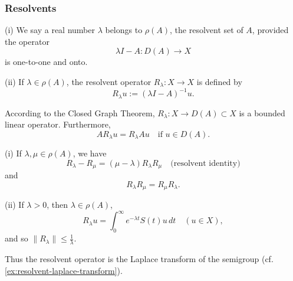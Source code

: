\subsubsection{Resolvents}

\begin{definition}
\label{def:resolvent-set-operator}
(i) We say a real number $\lambda$ belongs to $\rho(A)$, the resolvent set of $A$, provided the operator
\[
\lambda I - A : D(A) \to X
\]
is one-to-one and onto.

(ii) If $\lambda \in \rho(A)$, the resolvent operator $R_\lambda : X \to X$ is defined by
\[
R_\lambda u := (\lambda I - A)^{-1}u.
\]
\end{definition}

According to the Closed Graph Theorem, $R_\lambda : X \to D(A) \subset X$ is a bounded linear operator. Furthermore,
\[
AR_\lambda u = R_\lambda Au \quad \text{if } u \in D(A).
\]

\begin{theorem}
\label{thm:resolvent-operator-properties}
(i) If $\lambda, \mu \in \rho(A)$, we have
\[
R_\lambda - R_\mu = (\mu - \lambda)R_\lambda R_\mu \quad \text{(resolvent identity)}
\tag{12}
\]
and
\[
R_\lambda R_\mu = R_\mu R_\lambda.
\tag{13}
\]

(ii) If $\lambda > 0$, then $\lambda \in \rho(A)$,
\[
R_\lambda u = \int_0^\infty e^{-\lambda t}S(t)u \, dt \quad (u \in X),
\tag{14}
\]
and so $\|R_\lambda\| \leq \frac{1}{\lambda}$.
\end{theorem}

\begin{remark}
\label{rem:resolvent-laplace-transform-semigroup}
Thus the resolvent operator is the Laplace transform of the semigroup (cf. \cref{ex:resolvent-laplace-transform}).
\end{remark}

